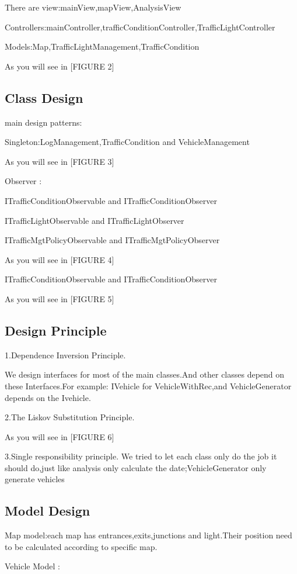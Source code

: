 \documentclass[12pt]{amsart}
\begin{document}
There are view:mainView,mapView,AnalysisView

Controllers:mainController,trafficConditionController,TrafficLightController

Models:Map,TrafficLightManagement,TrafficCondition

As you will see in [FIGURE 2]

\subsection{Class Design}
main design patterns:

Singleton:LogManagement,TrafficCondition and VehicleManagement

As you will see in [FIGURE 3]

Observer :

ITrafficConditionObservable and ITrafficConditionObserver 

ITrafficLightObservable and ITrafficLightObserver 

ITrafficMgtPolicyObservable and ITrafficMgtPolicyObserver 

As you will see in [FIGURE 4]

ITrafficConditionObservable and ITrafficConditionObserver 

As you will see in [FIGURE 5]

\subsection{Design Principle}
1.Dependence Inversion Principle.

We design interfaces for most of the main classes.And other classes depend on these Interfaces.For example: IVehicle for VehicleWithRec,and VehicleGenerator depends on the Ivehicle.

2.The Liskov Substitution Principle.

As you will see in [FIGURE 6]

3.Single responsibility principle.
We tried to let each class only do the job it should do,just like analysis only calculate  the date;VehicleGenerator only generate vehicles

\subsection{Model Design}
Map model:each map has entrances,exits,junctions and light.Their position need to be calculated according to  specific map.
   
Vehicle Model : 
\end{document}
